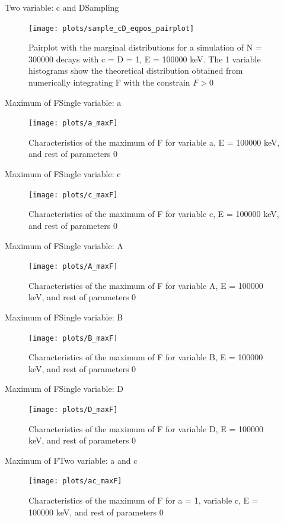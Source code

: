 \documentclass{beamer}
\begin{document}
\begin{frame}{Two variable: c and D}{Sampling}
	\begin{figure}
		\centering
		\texttt{[image: plots/sample\_cD\_eqpos\_pairplot]}
		\caption{Pairplot with the marginal distributions for a simulation of N = 300000 decays with c = D = 1, E = 100000 keV. The 1 variable histograms show the theoretical distribution obtained from numerically integrating F with the constrain $F > 0$}
	\end{figure}
\end{frame}
\begin{frame}{Maximum of F}{Single variable: a}
	\begin{figure}
		\centering
		\texttt{[image: plots/a\_maxF]}
		\caption{Characteristics of the maximum of F for variable a, E = 100000 keV, and rest of parameters 0}
	\end{figure}
\end{frame}
\begin{frame}{Maximum of F}{Single variable: c}
	\begin{figure}
		\centering
		\texttt{[image: plots/c\_maxF]}
		\caption{Characteristics of the maximum of F for variable c, E = 100000 keV, and rest of parameters 0}
	\end{figure}
\end{frame}
\begin{frame}{Maximum of F}{Single variable: A}
	\begin{figure}
		\centering
		\texttt{[image: plots/A\_maxF]}
		\caption{Characteristics of the maximum of F for variable A, E = 100000 keV, and rest of parameters 0}
	\end{figure}
\end{frame}
\begin{frame}{Maximum of F}{Single variable: B}
	\begin{figure}
		\centering
		\texttt{[image: plots/B\_maxF]}
		\caption{Characteristics of the maximum of F for variable B, E = 100000 keV, and rest of parameters 0}
	\end{figure}
\end{frame}
\begin{frame}{Maximum of F}{Single variable: D}
	\begin{figure}
		\centering
		\texttt{[image: plots/D\_maxF]}
		\caption{Characteristics of the maximum of F for variable D, E = 100000 keV, and rest of parameters 0}
	\end{figure}
\end{frame}
\begin{frame}{Maximum of F}{Two variable: a and c}
	\begin{figure}
		\centering
		\texttt{[image: plots/ac\_maxF]}
		\caption{Characteristics of the maximum of F for a = 1, variable c, E = 100000 keV, and rest of parameters 0}
	\end{figure}
\end{frame}
\end{document}
